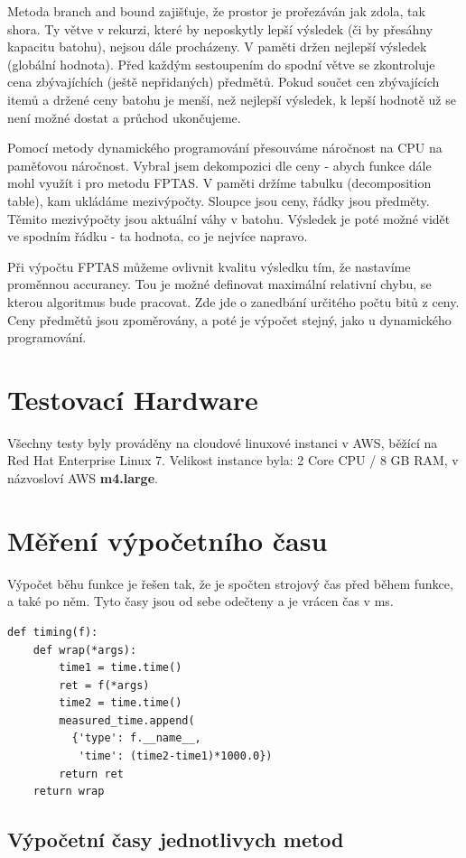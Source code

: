 \documentclass[a4paper,10pt,twocolumn]{article}
\begin{document}
Metoda branch and bound zajišťuje, že prostor je prořezáván jak zdola, tak shora. Ty větve v rekurzi, které by neposkytly lepší výsledek (či by přesáhny kapacitu batohu), nejsou dále procházeny. V paměti držen nejlepší výsledek (globální hodnota). Před každým sestoupením do spodní větve se zkontroluje cena zbývajíchích (ještě nepřidaných) předmětů. Pokud součet cen zbývajících itemů a držené ceny batohu je menší, než nejlepší výsledek, k lepší hodnotě už se není možné dostat a průchod ukončujeme.

Pomocí metody dynamického programování přesouváme náročnost na CPU na paměťovou náročnost. Vybral jsem dekompozici dle ceny - abych funkce dále mohl využít i pro metodu FPTAS. V paměti držíme tabulku (decomposition table), kam ukládáme mezivýpočty. Sloupce jsou ceny, řádky jsou předměty. Těmito mezivýpočty jsou aktuální váhy v batohu. Výsledek je poté možné vidět ve spodním řádku - ta hodnota, co je nejvíce napravo.

Při výpočtu FPTAS můžeme ovlivnit kvalitu výsledku tím, že nastavíme proměnnou accurancy. Tou je možné definovat maximální relativní chybu, se kterou algoritmus bude pracovat. Zde jde o zanedbání určitého počtu bitů z ceny. Ceny předmětů jsou zpoměrovány, a poté je výpočet stejný, jako u dynamického programování.


\section{Testovací Hardware}
Všechny testy byly prováděny na cloudové linuxové instanci v AWS, běžící na Red Hat Enterprise Linux 7. Velikost instance byla:
  2 Core CPU / 8 GB RAM, v názvosloví AWS \textbf{m4.large}.


\section{Měření výpočetního času}
Výpočet běhu funkce je řešen tak, že je spočten strojový čas před během funkce, a také po něm. Tyto časy jsou od sebe odečteny a je vrácen čas v ms.

   \begin{verbatim}
def timing(f):
    def wrap(*args):
        time1 = time.time()
        ret = f(*args)
        time2 = time.time()
        measured_time.append(
          {'type': f.__name__,
           'time': (time2-time1)*1000.0})
        return ret
    return wrap
   \end{verbatim}


\subsection{Výpočetní časy jednotlivych metod}
\end{document}
